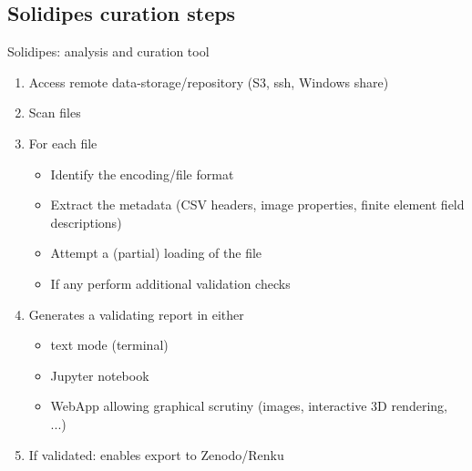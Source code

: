 \documentclass[10pt,compress,serif,aspectratio=169]{beamer}
\begin{document}
\subsection{Solidipes curation steps}
\begin{frame}{ Solidipes: analysis and curation tool}

\begin{enumerate}
  \item Access remote data-storage/repository (S3, ssh, Windows share)
\pause
  \item Scan files
\pause
  \item For each file
 \begin{itemize}
   \item Identify the encoding/file format
   \item Extract the metadata (CSV headers, image properties, finite element field descriptions)
   \item Attempt a (partial) loading of the file
   \item If any perform additional validation checks
 \end{itemize}
\pause
\item Generates a validating report in either
 \begin{itemize}
   \item text mode (terminal)
   \item Jupyter notebook
   \item WebApp allowing graphical scrutiny (images, interactive 3D rendering, ...)
\end{itemize}
\pause
\item If validated: enables export to Zenodo/Renku
 \end{enumerate}
\end{frame}


\end{document}

